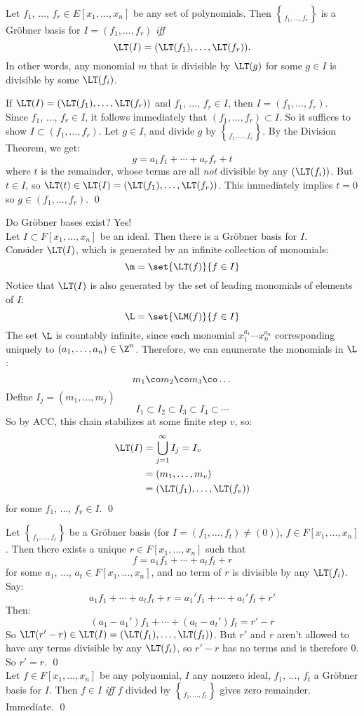  Let $f_1$, $\dotsc$, $f_r\in E[x_1,\dotsc,x_n]$ be any set of polynomials.  Then $\brace{f_1,\dotsc,f_r}$ is a Gr\"obner basis for $I=(f_1,\dotsc,f_r)$ \emph{iff}
\[ \LT(I) = (\LT(f_1),\dotsc,\LT(f_r)) . \]
In other words, any monomial $m$ that is divisible by $\LT(g)$ for some $g\in I$ is divisible by some $\LT(f_i)$.

\thm If $\LT(I)=(\LT(f_1),\dotsc,\LT(f_r))$ and $f_1$, $\dotsc$, $f_r\in I$, then $I=(f_1,\dotsc,f_r)$. \\
\pf Since $f_1$, $\dotsc$, $f_r\in I$, it follows immediately that $(f_1,\dotsc,f_r)\subset I$.  So it suffices to show $I\subset(f_1,\dotsc,f_r)$.  Let $g\in I$, and divide $g$ by $\brace{f_1,\dotsc,f_r}$.  By the Division Theorem, we get:
\[ g = a_1 f_1 + \dotsb + a_r f_r + t \]
where $t$ is the remainder, whose terms are all \emph{not} divisible by any $(\LT(f_i))$.  But $t\in I$, so $\LT(t)\in\LT(I)=(\LT(f_1),\dotsc,\LT(f_r))$.
This immediately implies $t=0$ so $g\in(f_1,\dotsc,f_r)$. \qed

Do Gr\"obner bases exist?  Yes! \\
\thm Let $I\subset F[x_1,\dotsc,x_n]$ be an ideal.  Then there is a Gr\"obner basis for $I$. \\
\pf Consider $\LT(I)$, which is generated by an infinite collection of monomials:
\[ \m = \set{\LT(f)}{f\in I} \]
Notice that $\LT(I)$ is also generated by the set of leading monomials of elements of $I$:
\[ \L = \set{\LM(f)}{f\in I} \]
The set $\L$ is countably infinite, since each monomial $x_1^{a_1}\dotsm x_n^{a_n}$ corresponding uniquely to $(a_1,\dotsc,a_n)\in\Z^n$.  Therefore, we can enumerate the monomials in $\L$:
\[ m_1\co m_2\co m_3\co \dotsc \]
Define $I_j = (m_1,\dotsc,m_j)$
\[ I_1 \subset I_2 \subset I_3 \subset I_4 \subset \dotsb \]
So by ACC, this chain stabilizes at some finite step $v$, so:
\begin{align*}
\LT(I) &= \bigcup_{j=1}^\infty I_j = I_v \\
&= (m_1,\dotsc,m_v) \\
&= (\LT(f_1),\dotsc,\LT(f_v))
\end{align*}
for some $f_1$, $\dotsc$, $f_v\in I$. \qed

\thm Let $\brace{f_1,\dotsc,f_t}$ be a Gr\"obner basis (for $I=(f_1,\dotsc,f_t)\neq(0)$), $f\in F[x_1,\dotsc,x_n]$.  Then there exists a unique $r\in F[x_1,\dotsc,x_n]$ such that
\[ f = a_1 f_1 + \dotsb + a_t f_t + r \]
for some $a_1$, $\dotsc$, $a_t\in F[x_1,\dotsc,x_n]$, and no term of $r$ is divisible by any $\LT(f_i)$. \\
\pf Say:
\[ a_1 f_1 + \dotsb + a_t f_t + r = a_1' f_1 + \dotsb + a_t' f_t + r' \]
Then:
\[ (a_1-a_1')f_1 + \dotsb + (a_t-a_t')f_t = r'-r \]
So $\LT(r'-r)\in\LT(I)=(\LT(f_1),\dotsc,\LT(f_t))$.  But $r'$ and $r$ aren't allowed to have any terms divisible by any $\LT(f_i)$, so $r'-r$ has no terms and is therefore $0$.  So $r'=r$. \qed \\
\cor Let $f\in F[x_1,\dotsc,x_n]$ be any polynomial, $I$ any nonzero ideal, $f_1$, $\dotsc$, $f_t$ a Gr\"obner basis for $I$.  Then $f\in I$ \emph{iff} $f$ divided by $\brace{f_1,\dotsc,f_t}$ gives zero remainder. \\
\pf Immediate. \qed

